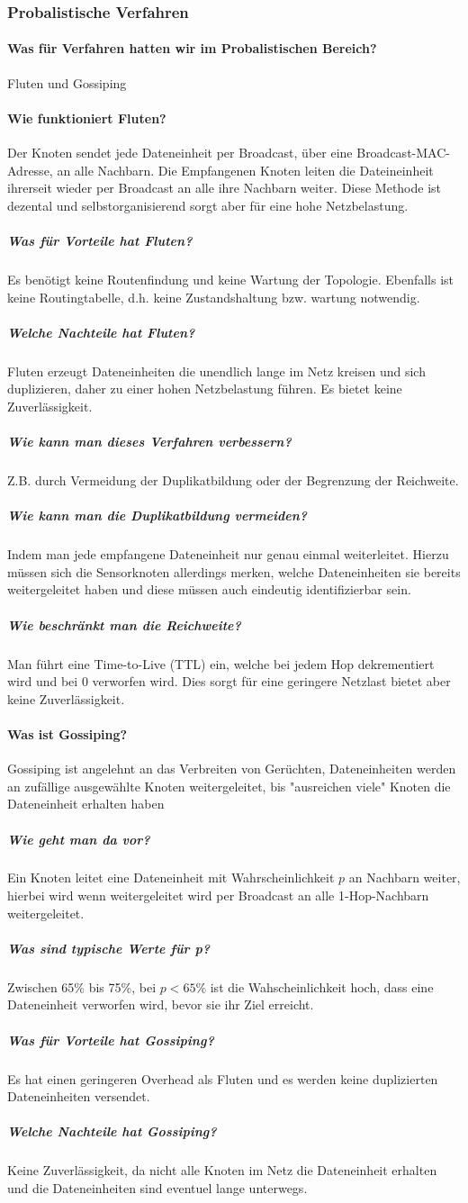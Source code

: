 \subsubsection{Probalistische Verfahren}
\paragraph{Was für Verfahren hatten wir im Probalistischen Bereich?}
	Fluten und Gossiping
	
\paragraph{Wie funktioniert Fluten?}
	Der Knoten sendet jede Dateneinheit per Broadcast, über eine Broadcast-MAC-Adresse, an alle Nachbarn. Die Empfangenen Knoten leiten die Dateineinheit ihrerseit wieder per Broadcast an alle ihre Nachbarn weiter. Diese Methode ist dezental und selbstorganisierend sorgt aber für eine hohe Netzbelastung.
	\subparagraph{Was für Vorteile hat Fluten?}
	Es benötigt keine Routenfindung und keine Wartung der Topologie. Ebenfalls ist keine Routingtabelle, d.h. keine Zustandshaltung bzw. wartung notwendig.
	\subparagraph{Welche Nachteile hat Fluten?}
	Fluten erzeugt Dateneinheiten die unendlich lange im Netz kreisen und sich duplizieren, daher zu einer hohen Netzbelastung führen. Es bietet keine Zuverlässigkeit.
	\subparagraph{Wie kann man dieses Verfahren verbessern?}
	Z.B. durch Vermeidung der Duplikatbildung oder der Begrenzung der Reichweite.
	\subparagraph{Wie kann man die Duplikatbildung vermeiden?}
	Indem man jede empfangene Dateneinheit nur genau einmal weiterleitet. Hierzu müssen sich die Sensorknoten allerdings merken, welche Dateneinheiten sie bereits weitergeleitet haben und diese müssen auch eindeutig identifizierbar sein.
	\subparagraph{Wie beschränkt man die Reichweite?}
	Man führt eine Time-to-Live (TTL) ein, welche bei jedem Hop dekrementiert wird und bei 0 verworfen wird.
	Dies sorgt für eine geringere Netzlast bietet aber keine Zuverlässigkeit.

\paragraph{Was ist Gossiping?}
	Gossiping ist angelehnt an das Verbreiten von Gerüchten, Dateneinheiten werden an zufällige ausgewählte Knoten weitergeleitet, bis "ausreichen viele" Knoten die Dateneinheit erhalten haben
	\subparagraph{Wie geht man da vor?}
	Ein Knoten leitet eine Dateneinheit mit Wahrscheinlichkeit $p$ an Nachbarn weiter, hierbei wird wenn weitergeleitet wird per Broadcast an alle 1-Hop-Nachbarn weitergeleitet.
	\subparagraph{Was sind typische Werte für p?}
	Zwischen 65\% bis 75\%, bei $p<65\%$ ist die Wahscheinlichkeit hoch, dass eine Dateneinheit verworfen wird, bevor sie ihr Ziel erreicht. 
	\subparagraph{Was für Vorteile hat Gossiping?}
	Es hat einen geringeren Overhead als Fluten und es werden keine duplizierten Dateneinheiten versendet.
	\subparagraph{Welche Nachteile hat Gossiping?}
	Keine Zuverlässigkeit, da nicht alle Knoten im Netz die Dateneinheit erhalten und die Dateneinheiten sind eventuel lange unterwegs.
